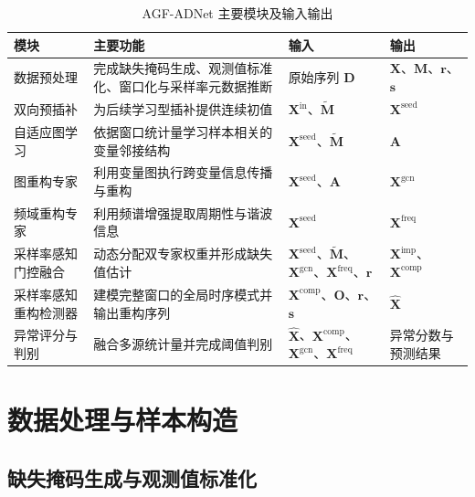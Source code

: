 \begin{table}[htbp]
    \centering
    \caption{AGF-ADNet 主要模块及输入输出}
    \label{tab:agf_adnet_modules}
    \begin{tabular}{p{2.4cm} p{4.8cm} p{3.0cm} p{3.0cm}}
        \hline
        模块 & 主要功能 & 输入 & 输出 \\
        \hline
        数据预处理 & 完成缺失掩码生成、观测值标准化、窗口化与采样率元数据推断 & 原始序列 $\mathbf{D}$ & $\mathbf{X}$、$\mathbf{M}$、$\mathbf{r}$、$\mathbf{s}$ \\
        双向预插补 & 为后续学习型插补提供连续初值 & $\mathbf{X}^{\mathrm{in}}$、$\widetilde{\mathbf{M}}$ & $\mathbf{X}^{\mathrm{seed}}$ \\
        自适应图学习 & 依据窗口统计量学习样本相关的变量邻接结构 & $\mathbf{X}^{\mathrm{seed}}$、$\widetilde{\mathbf{M}}$ & $\mathbf{A}$ \\
        图重构专家 & 利用变量图执行跨变量信息传播与重构 & $\mathbf{X}^{\mathrm{seed}}$、$\mathbf{A}$ & $\mathbf{X}^{\mathrm{gcn}}$ \\
        频域重构专家 & 利用频谱增强提取周期性与谐波信息 & $\mathbf{X}^{\mathrm{seed}}$ & $\mathbf{X}^{\mathrm{freq}}$ \\
        采样率感知门控融合 & 动态分配双专家权重并形成缺失值估计 & $\mathbf{X}^{\mathrm{seed}}$、$\widetilde{\mathbf{M}}$、$\mathbf{X}^{\mathrm{gcn}}$、$\mathbf{X}^{\mathrm{freq}}$、$\mathbf{r}$ & $\mathbf{X}^{\mathrm{imp}}$、$\mathbf{X}^{\mathrm{comp}}$ \\
        采样率感知重构检测器 & 建模完整窗口的全局时序模式并输出重构序列 & $\mathbf{X}^{\mathrm{comp}}$、$\mathbf{O}$、$\mathbf{r}$、$\mathbf{s}$ & $\hat{\mathbf{X}}$ \\
        异常评分与判别 & 融合多源统计量并完成阈值判别 & $\hat{\mathbf{X}}$、$\mathbf{X}^{\mathrm{comp}}$、$\mathbf{X}^{\mathrm{gcn}}$、$\mathbf{X}^{\mathrm{freq}}$ & 异常分数与预测结果 \\
        \hline
    \end{tabular}
\end{table}

\section{数据处理与样本构造}

\subsection{缺失掩码生成与观测值标准化}

